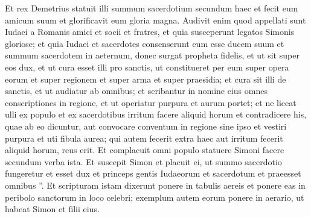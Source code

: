 \begin{biblechapter}
\begin{biblechapter}
\begin{biblechapter}
\begin{biblechapter}
\begin{biblechapter}
\begin{biblechapter}
\begin{biblechapter}
\begin{biblechapter}
\begin{biblechapter}
\begin{biblechapter}
\begin{biblechapter}
\begin{biblechapter}
\begin{biblechapter}
\begin{biblechapter}
\verse Et rex Demetrius statuit illi summum sacerdotium secundum haec 
 \verse et fecit eum amicum suum et glorificavit eum gloria magna. 
\verse Audivit enim quod appellati sunt Iudaei a Romanis amici et socii et fratres, et quia susceperunt legatos Simonis gloriose; 
\verse et quia Iudaei et sacerdotes consenserunt eum esse ducem suum et summum sacerdotem in aeternum, donec surgat propheta fidelis, 
\verse et ut sit super eos dux, et ut cura esset illi pro sanctis, ut constitueret per eum super opera eorum et super regionem et super arma et super praesidia; 
\verse et cura sit illi de sanctis, et ut audiatur ab omnibus; et scribantur in nomine eius omnes conscriptiones in regione, et ut operiatur purpura et aurum portet; 
\verse et ne liceat ulli ex populo et ex sacerdotibus irritum facere aliquid horum et contradicere his, quae ab eo dicuntur, aut convocare conventum in regione sine ipso et vestiri purpura et uti fibula aurea; 
\verse qui autem fecerit extra haec aut irritum fecerit aliquid horum, reus erit. 
\verse Et complacuit omni populo statuere Simoni facere secundum verba ista. 
\verse Et suscepit Simon et placuit ei, ut summo sacerdotio fungeretur et esset dux et princeps gentis Iudaeorum et sacerdotum et praeesset omnibus ”. 
\verse Et scripturam istam dixerunt ponere in tabulis aereis et ponere eas in peribolo sanctorum in loco celebri; 
\verse exemplum autem eorum ponere in aerario, ut habeat Simon et filii eius.
 

\end{biblechapter}
\end{biblechapter}
\end{biblechapter}
\end{biblechapter}
\end{biblechapter}
\end{biblechapter}
\end{biblechapter}
\end{biblechapter}
\end{biblechapter}
\end{biblechapter}
\end{biblechapter}
\end{biblechapter}
\end{biblechapter}
\end{biblechapter}
